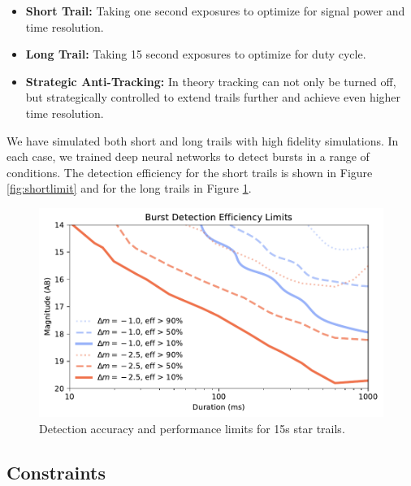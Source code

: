 \documentclass[12pt, letterpaper]{article}
\begin{document}
\begin{itemize}
\item \textbf{Short Trail:} Taking one second exposures to optimize for signal power and time resolution.

\item \textbf{Long Trail:} Taking 15 second exposures to optimize for duty cycle.

\item \textbf{Strategic Anti-Tracking:} In theory tracking can not only be turned off, but strategically controlled to extend trails further and achieve even higher time resolution. 
\end{itemize}

We have simulated both short and long trails with high fidelity simulations. In each case, we trained deep neural networks to detect bursts in a range of conditions. The detection efficiency for the short trails is shown in Figure \ref{fig:shortlimit} and for the long trails in Figure \ref{fig:longlimit}. 

\begin{figure}[htb!]
\center
\includegraphics{f7.pdf}
\caption{Detection accuracy and performance limits for 15s star trails.}
\label{fig:longlimit}
\end{figure}


\subsection{Constraints}
\end{document}
